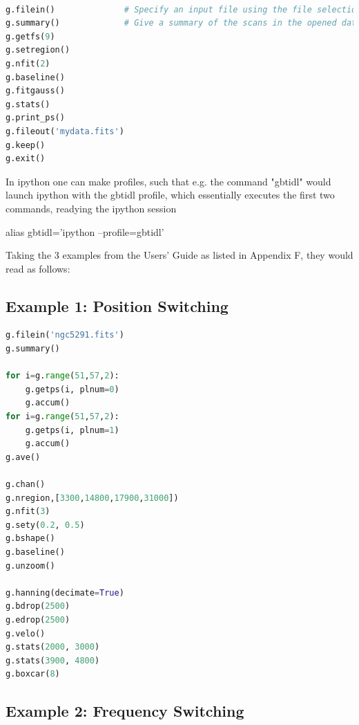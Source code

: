 \documentclass[12pt,a4paper]{article}
\begin{document}
\begin{lstlisting}[language=python]
% gbtidl                # start up an ipython session with the gbtidl profile

g.filein()              # Specify an input file using the file selection GUI
g.summary()             # Give a summary of the scans in the opened data file
g.getfs(9)
g.setregion()
g.nfit(2)
g.baseline()
g.fitgauss()
g.stats()
g.print_ps()
g.fileout('mydata.fits')
g.keep()
g.exit()

\end{lstlisting}


In ipython one can make profiles, such that e.g. the command "gbtidl" would launch ipython with
the gbtidl profile, which essentially executes the first two commands, readying the ipython
session 

    alias gbtidl='ipython --profile=gbtidl'

Taking the 3 examples from the Users' Guide as listed in Appendix F,
they would read as follows:

\subsection{Example 1:   Position Switching}

\begin{lstlisting}[language=python]
g.filein('ngc5291.fits')
g.summary()

for i=g.range(51,57,2):
    g.getps(i, plnum=0)
    g.accum()
for i=g.range(51,57,2):
    g.getps(i, plnum=1)
    g.accum()
g.ave()

g.chan()
g.nregion,[3300,14800,17900,31000])
g.nfit(3)
g.sety(0.2, 0.5)
g.bshape()
g.baseline()
g.unzoom()

g.hanning(decimate=True)
g.bdrop(2500)
g.edrop(2500)
g.velo()
g.stats(2000, 3000)
g.stats(3900, 4800)
g.boxcar(8)
\end{lstlisting}


\subsection{Example 2: Frequency Switching}
\end{document}

